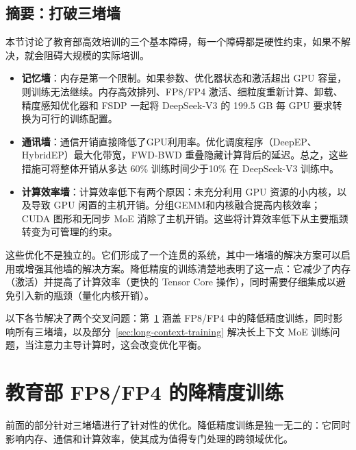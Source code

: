 \subsection{摘要：打破三堵墙}

本节讨论了教育部高效培训的三个基本障碍，每一个障碍都是硬性约束，如果不解决，就会阻碍大规模的实际培训。

\begin{itemize}
    \item \textbf{记忆墙}：内存是第一个限制。如果参数、优化器状态和激活超出 GPU 容量，则训练无法继续。内存高效排列、FP8/FP4 激活、细粒度重新计算、卸载、精度感知优化器和 FSDP 一起将 DeepSeek-V3 的 199.5 GB 每 GPU 要求转换为可行的训练配置。

    \item \textbf{通讯墙}：通信开销直接降低了GPU利用率。优化调度程序（DeepEP、HybridEP）最大化带宽，FWD-BWD 重叠隐藏计算背后的延迟。总之，这些措施可将整体开销从多达 60\% 训练时间少于10\% 在 DeepSeek-V3 训练中。

    \item \textbf{计算效率墙}：计算效率低下有两个原因：未充分利用 GPU 资源的小内核，以及导致 GPU 闲置的主机开销。分组GEMM和内核融合提高内核效率； CUDA 图形和无同步 MoE 消除了主机开销。这些将计算效率低下从主要瓶颈转变为可管理的约束。
\end{itemize}

这些优化不是独立的。它们形成了一个连贯的系统，其中一堵墙的解决方案可以启用或增强其他墙的解决方案。降低精度的训练清楚地表明了这一点：它减少了内存（激活）并提高了计算效率（更快的 Tensor Core 操作），同时需要仔细集成以避免引入新的瓶颈（量化内核开销）。

以下各节解决了两个交叉问题：第~\ref{sec:reduced-precision-training} 涵盖 FP8/FP4 中的降低精度训练，同时影响所有三堵墙，以及部分~\ref{sec:long-context-training} 解决长上下文 MoE 训练问题，当注意力主导计算时，这会改变优化平衡。



\section{教育部 FP8/FP4 的降精度训练}\label{sec:reduced-precision-training}

前面的部分针对三堵墙进行了针对性的优化。降低精度训练是独一无二的：它同时影响内存、通信和计算效率，使其成为值得专门处理的跨领域优化。

